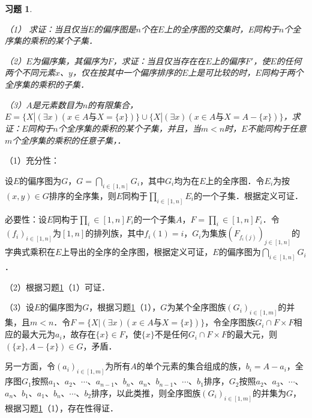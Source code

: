 \documentclass[12pt, a4paper, oneside]{book}
\newtheorem{exer}{习题}
\begin{document}
			\begin{exer}\label{exer136}
				\hfill\par
				（1）	求证：当且仅当$E$的偏序图是$n$个在$E$上的全序图的交集时，E同构于$n$个全序集的乘积的某个子集．
				\par
				（2）$E$为偏序集，其偏序为$F$，求证：当且仅当存在在$E$上的偏序$F'$，使$E$的任何两个不同元素$x$、$y$，仅在按其中一个偏序排序的$E$上是可比较的时，$E$同构于两个全序集的乘积的子集．
				\par
				（3）$A$是元素数目为$n$的有限集合，$E=\{X|(\exists x)(x\in A\text{与}X=\{x\})\}\cup\{X|(\exists x)(x\in A\text{与}X=A-\{x\})\}$，求证：$E$同构于$n$个全序集的乘积的某个子集，并且，当$m<n$时，$E$不能同构于任意$m$个全序集的乘积的任意子集，．
			\end{exer}
			（1）充分性：
			\par
			设$E$的偏序图为$G$，$G=\bigcap\limits_{i\in [1, n]}G_i$，其中$G_i$均为在$E$上的全序图．令$E_i$为按$(x, y)\in G$排序的全序集，则$E$同构于$\prod\limits_{i\in [1, n]}E_i$的一个子集．根据定义可证．
			\par
			必要性：设$E$同构于$\prod\limits_i\in [1, n]F_i$的一个子集$A$，$F=\prod\limits_i\in [1, n]F_i$．令$(f_i)_{i\in [1, n]}$为$[1, n]$的排列族，其中$f_i(1)=i$，$G_i$为集族$(F_{f_i(j)})_{j\in [1, n]}$的字典式乘积在$E$上导出的全序的全序图，根据定义可证，$E$的偏序图为$\bigcap\limits_{i\in [1, n]}G_i$．
			\par
			（2）根据习题\ref{exer136}（1）可证．
			\par
			（3）设$E$的偏序图为$G$，根据习题\ref{exer136}（1），$G$为某个全序图族$(G_i)_{i\in [1, m]}$的并集，且$m<n$．令$F=\{X|(\exists x)(x\in A\text{与}X=\{x\})\}$，令全序图族$G_i\cap F\times F$相应的最大元为$a_i$，故存在$\{x\}\in F$，使$\{x\}$不是任何$G_i\cap F\times F$的最大元，则$(\{x\}, A-\{x\})\in G$，矛盾．
			\par
			另一方面，令$(a_i)_{i\in [1, m]}$为所有$A$的单个元素的集合组成的族，$b_i=A-a_i$，全序图$G_1$按照$a_1$、$a_2$、$\cdots$、$a_{n-1}$、$b_n$、$a_n$、$b_{n-1}$、$\cdots$、$b_1$排序，$G_2$按照$a_2$、$a_3$、$\cdots$、$a_n$、$b_1$、$a_1$、$b_n$、$\cdots$、$b_2$排序，以此类推，则全序图族$(G_i)_{i\in [1, m]}$的并集为$G$，根据习题\ref{exer136}（1），存在性得证．
			
\end{document}
